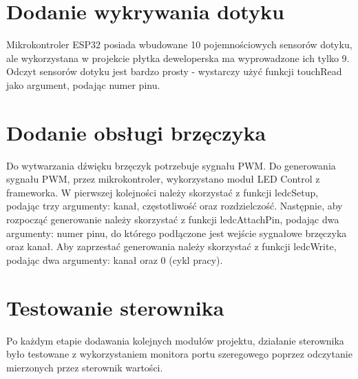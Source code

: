 \documentclass[11pt]{report}
\begin{document}
 \section{Dodanie wykrywania dotyku}
 Mikrokontroler ESP32 posiada wbudowane 10 pojemnościowych sensorów dotyku, ale wykorzystana w projekcie płytka deweloperska ma wyprowadzone ich tylko 9. Odczyt sensorów dotyku jest bardzo prosty - wystarczy użyć funkcji touchRead jako argument, podając numer pinu.
 
 \section{Dodanie obsługi brzęczyka}
 Do wytwarzania dźwięku brzęczyk potrzebuje sygnału PWM. Do generowania sygnału PWM, przez mikrokontroler, wykorzystano moduł LED Control z frameworka. W pierwszej kolejności należy skorzystać z funkcji ledcSetup, podając trzy argumenty: kanał, częstotliwość oraz rozdzielczość. Następnie, aby rozpocząć generowanie należy skorzystać z funkcji ledcAttachPin, podając dwa argumenty: numer pinu, do którego podłączone jest wejście sygnałowe brzęczyka oraz kanał.
 Aby zaprzestać generowania należy skorzystać z funkcji ledcWrite, podając dwa argumenty: kanał oraz 0 (cykl pracy).
 
 \section{Testowanie sterownika}
 Po każdym etapie dodawania kolejnych modułów projektu, działanie sterownika było testowane z wykorzystaniem monitora portu szeregowego poprzez odczytanie mierzonych przez sterownik wartości.

 
\end{document}
